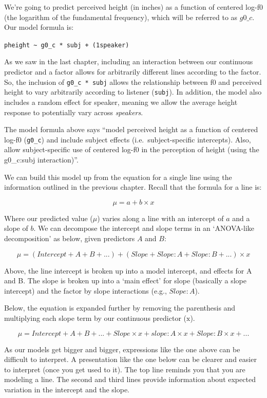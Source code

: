 \documentclass[
]{book}
\begin{document}
We're going to predict perceived height (in inches) as a function of centered log-f0 (the logarithm of the fundamental frequency), which will be referred to as \(g0\_c\). Our model formula is:

\texttt{pheight\ \textasciitilde{}\ g0\_c\ *\ subj\ +\ (1\textbar{}speaker)}

As we saw in the last chapter, including an interaction between our continuous predictor and a factor allows for arbitrarily different lines according to the factor. So, the inclusion of \texttt{g0\_c\ *\ subj} allows the relationship between f0 and perceived height to vary arbitrarily according to listener (\texttt{subj}). In addition, the model also includes a random effect for speaker, meaning we allow the average height response to potentially vary across \emph{speakers}.

The model formula above says ``model perceived height as a function of centered log-f0 (\texttt{g0\_c}) and include subject effects (i.e.~subject-specific intercepts). Also, allow subject-specific use of centered log-f0 in the perception of height (using the g0\_c:subj interaction)''.

We can build this model up from the equation for a single line using the information outlined in the previous chapter. Recall that the formula for a line is:

\[
\mu = a + b \times x
\label{eq:61}
\]

Where our predicted value (\(\mu\)) varies along a line with an intercept of \(a\) and a slope of \(b\). We can decompose the intercept and slope terms in an `ANOVA-like decomposition' as below, given predictors \(A\) and \(B\):

\[
\mu = (Intercept + A + B + ...) + (Slope + Slope \colon A + Slope \colon B + ...) \times x
\label{eq:62}
\]

Above, the line intercept is broken up into a model intercept, and effects for A and B. The slope is broken up into a `main effect' for slope (basically a slope intercept) and the factor by slope interactions (e.g., \(Slope \colon A\)).

Below, the equation is expanded further by removing the parenthesis and multiplying each slope term by our continuous predictor (\(\mathrm{x}\)).

\[
\mu = Intercept + A + B + ... + Slope \times x + slope \colon A \times x + Slope \colon B \times x + ...
\label{eq:63}
\]

As our models get bigger and bigger, expressions like the one above can be difficult to interpret. A presentation like the one below can be clearer and easier to interpret (once you get used to it). The top line reminds you that you are modeling a line. The second and third lines provide information about expected variation in the intercept and the slope.
\end{document}
